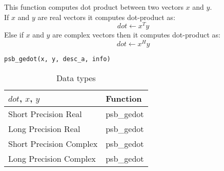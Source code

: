 This function computes dot product between two vectors $x$ and
$y$.\\
If $x$ and $y$ are real vectors
it computes dot-product as:
\[dot \leftarrow x^T y\]
Else if $x$ and $y$ are complex vectors then it computes dot-product as:
\[dot \leftarrow x^H y\]

\begin{verbatim}
psb_gedot(x, y, desc_a, info)
\end{verbatim}
\begin{table}[h]
\begin{center}
\begin{tabular}{ll}
\hline
$dot$, $x$, $y$ & {\bf Function}\\
\hline
Short Precision Real & psb\_gedot \\
Long Precision Real & psb\_gedot \\
Short Precision Complex & psb\_gedot \\	
Long Precision Complex & psb\_gedot \\	
\hline
\end{tabular}
\end{center}
\caption{Data types\label{tab:f90dot}}
\end{table}

